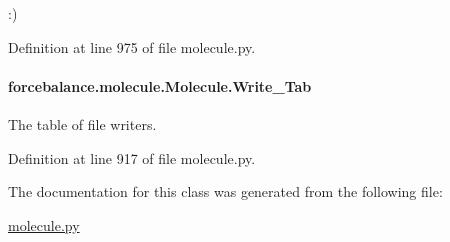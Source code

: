 \-:) 

Definition at line 975 of file molecule.\-py.

\hypertarget{classforcebalance_1_1molecule_1_1Molecule_a85310a28c678cb386f9d2b584b24320d}{
\paragraph[{Write\-\_\-\-Tab}]{\setlength{\rightskip}{0pt plus 5cm}forcebalance.\-molecule.\-Molecule.\-Write\-\_\-\-Tab}}\label{classforcebalance_1_1molecule_1_1Molecule_a85310a28c678cb386f9d2b584b24320d}


The table of file writers. 



Definition at line 917 of file molecule.\-py.



The documentation for this class was generated from the following file\-:\begin{DoxyCompactItemize}
\item 
\hyperlink{molecule_8py}{molecule.\-py}\end{DoxyCompactItemize}
